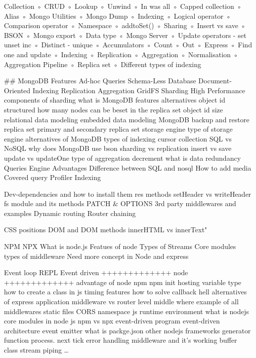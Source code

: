 
 Collection
 ◦ CRUD
 ◦ Lookup
 ◦ Unwind
 ◦ In was all
 ◦ Capped collection
 ◦ Alias
 ◦ Mongo Utilities
 ◦ Mongo Dump
 ◦ Indexing
 ◦ Logical operator
 ◦ Comparison operator
 ◦ Namespace
 ◦ addtoSet()
 ◦ Sharing
 ◦ Insert vs save
 ◦ BSON
 ◦ Mongo export
 ◦ Data type
 ◦ Mongo Server
 ◦ Update operators - set unset inc
 ◦ Distinct - unique
 ◦ Accumulators
 ◦ Count
 ◦ Out
 ◦ Express
 ◦ Find one and update
 ◦ Indexing
 ◦ Replication
 ◦ Aggregation
 ◦ Normalisation
 ◦ Aggregation Pipeline
 ◦ Replica set
 ◦ Different types of indexing


## MongoDB Features
Ad-hoc Queries
Schema-Less Database
Document-Oriented
Indexing
Replication
Aggregation
GridFS
Sharding
High Performance
components of sharding 
what is MongoDB features alternatives 
object id structured 
how many nodes can be beset in the replica set 
object id size 
relational data modeling 
embedded data modeling 
MongoDB backup and restore 
replica set 
primary and secondary replica set 
storage engine type of storage engine 
alternatives of MongoDB
types of indexing  
cursor
collection 
SQL vs NoSQL 
why does MongoDB use bson
sharding vs replication 
insert vs save 
update vs updateOne 
type of aggregation 
decrement 
what is data redundancy 
Queries
Engine
Advantages
Difference between SQL and nosql
How to add media
Covered query
Profiler
Indexing


Dev-dependencies and how to install them
res methods
setHeader vs writeHeader
fs module and its methods
PATCH & OPTIONS
3rd party middlewares and examples
Dynamic routing
Router chaining

CSS positions
DOM and DOM methods
innerHTML vs innerText"

NPM
NPX
What is node.js
Featues of node
Types of Streams
Core modules
types of middleware
Need more concept in Node and express

Event loop
REPL
Event driven
+++++++++++++
node
+++++++++++++
advantage of node 
npm 
npm init 
hosting 
variable type 
how to create a class in js 
timing features 
how to solve callback hell 
alternatives of express 
application middleware vs router level middle where 
example of all middlewares
static files 
CORS 
namespace js 
runtime environment 
what is nodejs 
core modules in node js 
npm vs npx
event-driven program 
event-driven architecture
event emitter 
what is packge.json 
other nodejs frameworks
generator function 
process. next tick 
error handling middleware and it's working 
buffer class
stream 
piping 
…

